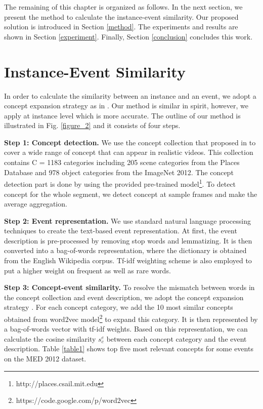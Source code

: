 The remaining of this chapter is organized as follows. In the next section, we present the method to calculate the instance-event similarity. Our proposed solution is introduced in Section \ref{method}. The experiments and results are shown in Section \ref{experiment}. Finally, Section \ref{conclusion} concludes this work.

\section{Instance-Event Similarity}
In order to calculate the similarity between an instance and an event, we adopt a concept expansion strategy as in \cite{chen2014event}. Our method is similar in spirit, however, we apply at instance level which is more accurate. The outline of our method is illustrated in Fig. \ref{figure_2} and it consists of four steps.

\textbf{Step 1: Concept detection.} We use the concept collection that proposed in \cite{zhou2014places} to cover a wide range of concept that can appear in realistic videos. This collection contains C = 1183 categories including 205 scene categories from the Places Database\cite{zhou2014learning} and 978 object categories from the ImageNet 2012\cite{deng2009imagenet}. The concept detection part is done by using the provided pre-trained model\footnote{http://places.csail.mit.edu}. To detect concept for the whole segment, we detect concept at sample frames and make the average aggregation.   

\textbf{Step 2: Event representation.} We use standard natural language processing techniques to create the text-based event representation. At first, the event description is pre-processed by removing stop words and lemmatizing. It is then converted into a bag-of-words representation, where the dictionary is obtained from the English Wikipedia corpus. Tf-idf weighting scheme is also employed to put a higher weight on frequent as well as rare words.   

\textbf{Step 3: Concept-event similarity.} To resolve the mismatch between words in the concept collection and event description, we adopt the concept expansion strategy \cite{chen2014event}. For each concept category, we add the 10 most similar concepts obtained from word2vec\cite{mikolov2013efficient} model\footnote{https://code.google.com/p/word2vec} to expand this category. It is then represented by a bag-of-words vector with tf-idf weights. Based on this representation, we can calculate the cosine similarity $s_{c}^{e}$ between each concept category and the event description. Table \ref{table1} shows top five most relevant concepts for some events on the MED 2012 dataset.   

